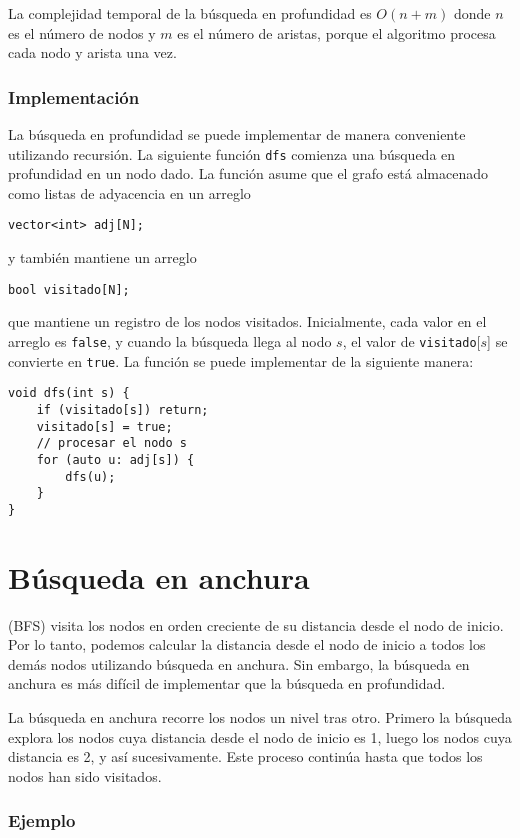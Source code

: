 La complejidad temporal de la búsqueda en profundidad es $O(n+m)$
donde $n$ es el número de nodos y $m$ es el
número de aristas,
porque el algoritmo procesa cada nodo y arista una vez.

\subsubsection*{Implementación}

La búsqueda en profundidad se puede implementar de manera conveniente
utilizando recursión.
La siguiente función \texttt{dfs} comienza
una búsqueda en profundidad en un nodo dado.
La función asume que el grafo está
almacenado como listas de adyacencia en un arreglo
\begin{lstlisting}
vector<int> adj[N];
\end{lstlisting}
y también mantiene un arreglo
\begin{lstlisting}
bool visitado[N];
\end{lstlisting}
que mantiene un registro de los nodos visitados.
Inicialmente, cada valor en el arreglo es \texttt{false},
y cuando la búsqueda llega al nodo $s$,
el valor de \texttt{visitado}[$s$] se convierte en \texttt{true}.
La función se puede implementar de la siguiente manera:
\begin{lstlisting}
void dfs(int s) {
    if (visitado[s]) return;
    visitado[s] = true;
    // procesar el nodo s
    for (auto u: adj[s]) {
        dfs(u);
    }
}
\end{lstlisting}

\section{Búsqueda en anchura}


 (BFS) visita los nodos
en orden creciente de su distancia
desde el nodo de inicio.
Por lo tanto, podemos calcular la distancia
desde el nodo de inicio a todos los demás
nodos utilizando búsqueda en anchura.
Sin embargo, la búsqueda en anchura es más difícil
de implementar que la búsqueda en profundidad.

La búsqueda en anchura recorre los nodos
un nivel tras otro.
Primero la búsqueda explora los nodos cuya
distancia desde el nodo de inicio es 1,
luego los nodos cuya distancia es 2, y así sucesivamente.
Este proceso continúa hasta que todos los nodos
han sido visitados.

\subsubsection*{Ejemplo}

